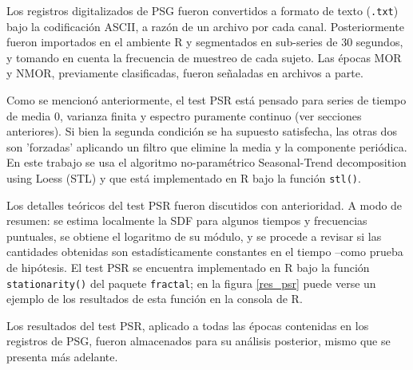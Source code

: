 \documentclass[12pt,a4paper]{mitthesis}
\begin{document}
Los registros digitalizados de PSG fueron convertidos a formato de texto (\texttt{.txt}) bajo la 
codificaci\'on ASCII, a raz\'on de un archivo por cada canal. Posteriormente fueron importados en 
el ambiente R y segmentados en sub-series de 30 segundos, y tomando en cuenta la frecuencia de
muestreo de cada sujeto. 
Las \'epocas MOR y NMOR, previamente clasificadas, fueron se\~naladas en archivos a parte.

Como se mencion\'o anteriormente, el test PSR est\'a pensado para series de tiempo de media 0, 
varianza finita y espectro puramente continuo (ver secciones anteriores). Si bien la segunda 
condici\'on se ha supuesto satisfecha, las otras dos son 'forzadas' aplicando  un filtro que 
elimine la media y la componente peri\'odica.
En este trabajo se usa el algoritmo no-param\'etrico Seasonal-Trend decomposition using Loess 
(STL) \cite{Cleveland1990} y que est\'a implementado en R bajo la funci\'on \texttt{stl()}.

Los detalles te\'oricos del test PSR fueron discutidos con anterioridad. A modo de resumen: se 
estima localmente la SDF para algunos tiempos y frecuencias puntuales, se obtiene el logaritmo de
su m\'odulo, y se procede a revisar si las cantidades obtenidas son estad\'isticamente constantes
en el tiempo --como prueba de hip\'otesis.
El test PSR se encuentra implementado en R bajo la funci\'on \texttt{stationarity()} del paquete 
\texttt{fractal}; en la figura \ref{res_psr} puede verse un ejemplo de los resultados de esta 
funci\'on en la consola de R.

Los resultados del test PSR, aplicado a todas las \'epocas contenidas en los registros de PSG,
fueron almacenados para su an\'alisis posterior, mismo que se presenta m\'as adelante.
\end{document}
